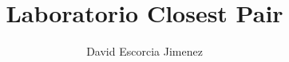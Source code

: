 \documentclass[journal,onecolumn]{IEEEtran}	%
\begin{document}
\title{Laboratorio Closest Pair}%
\author{David Escorcia Jimenez}		%
\maketitle				%






\end{document}
